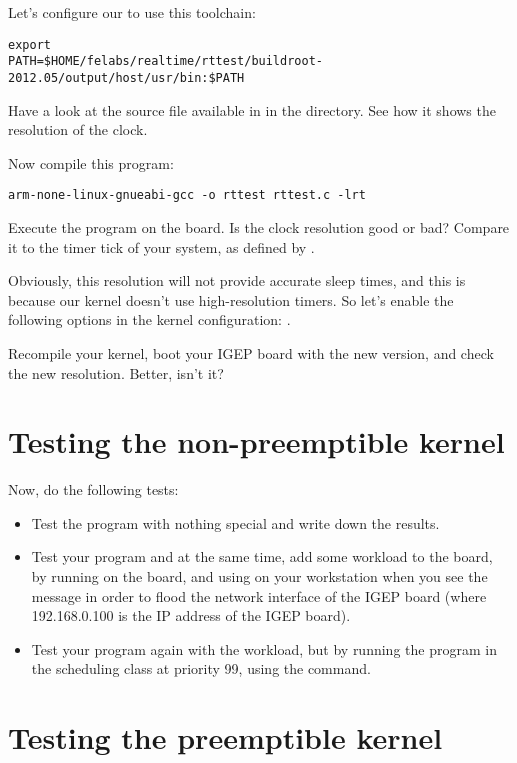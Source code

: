 Let's configure our  to use this toolchain:

\begin{verbatim}
export
PATH=$HOME/felabs/realtime/rttest/buildroot-2012.05/output/host/usr/bin:$PATH
\end{verbatim}

Have a look at the  source file available in  in
the  directory. See how it shows the resolution of the
 clock.

Now compile this program:
\begin{verbatim}
arm-none-linux-gnueabi-gcc -o rttest rttest.c -lrt
\end{verbatim}

Execute the program on the board. Is the clock resolution good or bad?
Compare it to the timer tick of your system, as defined by .

Obviously, this resolution will not provide accurate sleep times, and
this is because our kernel doesn't use high-resolution timers. So
let's enable the following options in the kernel configuration:
.

Recompile your kernel, boot your IGEP board with the new version, and
check the new resolution. Better, isn't it?

\section{Testing the non-preemptible kernel}

Now, do the following tests:
\begin{itemize}
\item Test the program with nothing special and write down the
  results.
\item Test your program and at the same time, add some workload to the
  board, by running  on the board,
  and using  on your workstation when
  you see the message  in order to
  flood the network interface of the IGEP board (where 192.168.0.100
  is the IP address of the IGEP board).
\item Test your program again with the workload, but by running the
  program in the  scheduling class at priority 99,
  using the  command.
\end{itemize}

\section{Testing the preemptible kernel}

